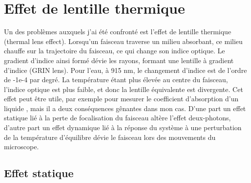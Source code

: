 \section{Effet de lentille thermique}


Un des problèmes auxquels j'ai été confronté est l'effet de lentille thermique (thermal lens effect). Lorsqu'un faisceau traverse un milieu absorbant, ce milieu chauffe sur la trajectoire du faisceau, ce qui change son indice optique. Le gradient d'indice ainsi formé dévie les rayons, formant une lentille à gradient d'indice (GRIN lens). Pour l'eau, à 915 nm, le changement d'indice est de l'ordre de -1e-4 par degré. La température étant plus élevée au centre du faisceau, l'indice optique est plus faible, et donc la lentille équivalente est divergente. Cet effet peut être utile, par exemple pour mesurer le coefficient d'absorption d'un liquide \cite{whinnery_laser_1974}, mais il a deux conséquences gênantes dans mon cas. D'une part un effet statique lié à la perte de focalisation du faisceau altère l'effet deux-photons, d'autre part un effet dynamique lié à la réponse du système à une perturbation de la température d'équilibre dévie le faisceau lors des mouvements du microscope.



\subsection{Effet statique}

